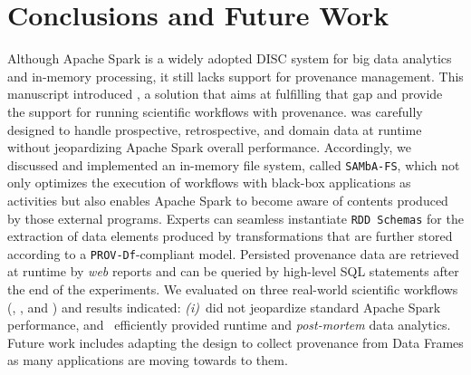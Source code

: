 \section{Conclusions and Future Work}\label{sec:conclusions}


Although Apache Spark is a widely adopted DISC system for big data analytics and in-memory processing, it still lacks support for provenance management. 
This manuscript introduced \system, a solution that aims at fulfilling that gap and provide the support for running scientific workflows with provenance.
\system was carefully designed to handle prospective, retrospective, and domain data at runtime without jeopardizing Apache Spark overall performance.
Accordingly, we discussed and implemented an in-memory file system, called \texttt{SAMbA-FS}, which not only optimizes the execution of workflows with black-box applications as activities but also enables Apache Spark to become aware of contents produced by those external programs.
Experts can seamless instantiate \texttt{RDD Schemas} for the extraction of data elements produced by transformations that are further stored according to a \texttt{PROV-Df}-compliant model.
Persisted provenance data are retrieved at runtime by \textit{web} reports and can be queried by high-level SQL statements after the end of the experiments.
We evaluated \system on three real-world scientific workflows (\word, \montage, and \sci) and results indicated: 
\textit{(i)}~\system did not jeopardize standard Apache Spark performance, and 
~\system efficiently provided runtime and \textit{post-mortem} data analytics.
Future work includes adapting the \system design to collect provenance from Data Frames as many applications are moving towards to them.



